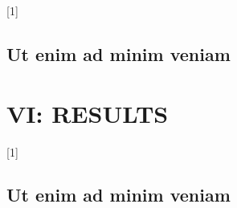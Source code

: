 \begin{chapterabstract}
	\lipsum[1]
\end{chapterabstract}

\lipsum[2][1-4]{} [1]

\lipsum[4]

\section{Ut enim ad minim veniam}









\chapter{VI: RESULTS}

\begin{chapterabstract}
	\lipsum[1]
\end{chapterabstract}

\lipsum[2][1-4]{} [1]

\lipsum[4]

\section{Ut enim ad minim veniam}












